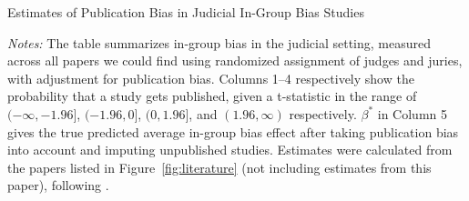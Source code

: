 \documentclass[12pt,english]{article}
\newcommand{\HOME}{\string~}
\newcommand{\curpath}{\HOME/ddl/justice-overleaf}
\newcommand{\curpath}{.}
\begin{document}
\clearpage


\begin{table}%
  \begin{center}
    \caption{Estimates of Publication Bias in Judicial In-Group Bias Studies}
    \label{tab:pub_bias}
   
    \begin{minipage}{1\textwidth}
      \footnotesize \vspace{1mm} \emph{Notes:} The table summarizes in-group bias in the judicial setting, measured across all papers we could find using randomized assignment of judges and juries, with adjustment for publication bias. Columns 1--4 respectively show the probability that a study gets published, given a t-statistic in the range of $(-\infty, -1.96]$, $(-1.96, 0]$, $(0, 1.96]$, and $(1.96,\infty)$ respectively. $\beta^*$ in Column 5 gives the true predicted average in-group bias effect after taking publication bias into account and imputing unpublished studies.  Estimates were calculated from the papers listed in Figure~\ref{fig:literature} (not including estimates from this paper), following \cite{andrews2019bias}.
    \end{minipage}
  \end{center}
\end{table}

\clearpage 

\begin{singlespace}


\end{singlespace}

\clearpage
\end{document}
